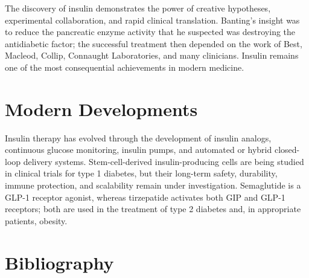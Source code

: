 The discovery of insulin demonstrates the power of creative hypotheses, experimental collaboration, and rapid clinical translation. Banting's insight was to reduce the pancreatic enzyme activity that he suspected was destroying the antidiabetic factor; the successful treatment then depended on the work of Best, Macleod, Collip, Connaught Laboratories, and many clinicians. Insulin remains one of the most consequential achievements in modern medicine.\cite{banting-facts,insulin-history}


\section{Modern Developments}

Insulin therapy has evolved through the development of insulin analogs, continuous glucose monitoring, insulin pumps, and automated or hybrid closed-loop delivery systems. Stem-cell-derived insulin-producing cells are being studied in clinical trials for type 1 diabetes, but their long-term safety, durability, immune protection, and scalability remain under investigation. Semaglutide is a GLP-1 receptor agonist, whereas tirzepatide activates both GIP and GLP-1 receptors; both are used in the treatment of type 2 diabetes and, in appropriate patients, obesity.\cite{insulin-modern}


\section{Bibliography}

